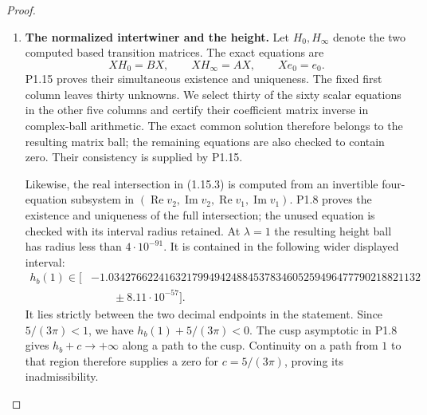 \begin{proof}
\begin{enumerate}[label=\arabic*.]
For each step put
\[
 d_0=\max(|\operatorname{Re}z|,|\operatorname{Im}z|),\quad
 d_*=\max(|\operatorname{Re}(z+a)|,|\operatorname{Im}z|),
 \quad R=\tfrac12\min(d_0,d_*).
\]
The segment is subdivided with rational increments $h$ satisfying
$|h|_1=|\operatorname{Re}h|+|\operatorname{Im}h|\le R/4$.
The whole complex disc $|t|\le R$ avoids both poles, and on it
\[
 \|\widetilde\Gamma(z+t)\|_\infty\le
 M=\frac{\|R_0\|_\infty}{d_0-R}
   +\frac{\|R_*\|_\infty}{d_*-R}.
\]
The integral equation and Gronwall's estimate
\cite[Lemma~2.7, pp.~42--43]{TeschlODE2012}, followed by Cauchy's
coefficient formula
\cite[\S1.9(iii), (1.9.30)--(1.9.31)]{DLMFCauchy2026}, give the
entrywise degree-$N$ tail bound
\[
 E_N=\exp(MR)\frac{(|h|_1/R)^{N+1}}{1-|h|_1/R}.
 \tag{1.16.1}
\]
Adding the real and imaginary error balls of radius $E_N$ to each
entry therefore encloses the exact transition.  All subsequent
matrix products and inverses retain those radii.  The order starts
at $32$ and is increased by $16$ until $E_N<10^{-100}$.
There are $120$ steps for the zero meridian, $66$ for the infinity
meridian and $6$ for the open path, hence $192$ in total; the
largest order is $192$.  Every rational center, increment, radius,
order, norm bound and error ball is saved.

\item \textbf{The normalized intertwiner and the height.}
Let $H_0,H_\infty$ denote the two computed based transition matrices.
The exact equations are
\[
 XH_0=BX,\qquad XH_\infty=AX,\qquad Xe_0=e_0.
\]
P1.15 proves their simultaneous existence and uniqueness.  The
fixed first column leaves thirty unknowns.  We select thirty of
the sixty scalar equations in the other five columns and certify
their coefficient matrix inverse in complex-ball arithmetic.
The exact common solution therefore belongs to the resulting
matrix ball; the remaining equations are also checked to contain
zero.  Their consistency is supplied by P1.15.

Likewise, the real intersection in (1.15.3) is computed from an
invertible four-equation subsystem in
$(\operatorname{Re}v_2,\operatorname{Im}v_2,
  \operatorname{Re}v_1,\operatorname{Im}v_1)$.
P1.8 proves the existence and uniqueness of the full intersection;
the unused equation is checked with its interval radius retained.
At $\lambda=1$ the resulting height ball has radius less than
$4\cdot10^{-91}$.  It is contained in the following wider displayed
interval:
\[
\begin{aligned}
 h_b(1)\in\bigl[&
 -1.03427662241632179949424884537834605259496477790218821132\\
 &\qquad\mathbin{\pm}8.11\cdot10^{-57}\bigr].
\end{aligned}
\]
It lies strictly between the two decimal endpoints in the statement.
Since $5/(3\pi)<1$, we have $h_b(1)+5/(3\pi)<0$.
The cusp asymptotic in P1.8 gives $h_b+c\to+\infty$ along a path
to the cusp.  Continuity on a path from $1$ to that region therefore
supplies a zero for $c=5/(3\pi)$, proving its inadmissibility.


\end{enumerate}
\end{proof}

